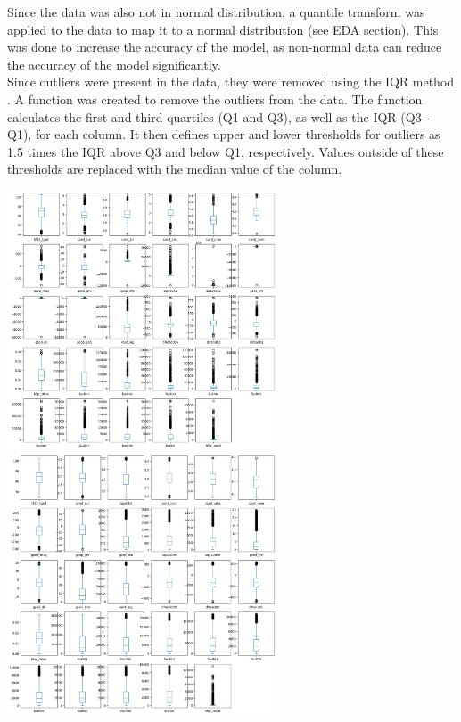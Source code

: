 \documentclass{article}[12pt]
\begin{document}
\indent
Since the data was also not in normal distribution, a quantile transform was applied to the data to map it to a normal distribution (see EDA section). This was done to increase the accuracy of the model, as non-normal data can reduce the accuracy of the model significantly.\\
\indent
Since outliers were present in the data, they were removed using the IQR method \cite{IQR}. A function was created to remove the outliers from the data. The function calculates the first and third quartiles (Q1 and Q3), as well as the IQR (Q3 - Q1), for each column. It then defines upper and lower thresholds for outliers as 1.5 times the IQR above Q3 and below Q1, respectively. Values outside of these thresholds are replaced with the median value of the column.\\

\begin{center}
    \includegraphics[width=0.6\textwidth]{box-whisker.png}
    \includegraphics[width=0.6\textwidth]{box-whister-after-outliers.png}
\end{center}
\end{document}
